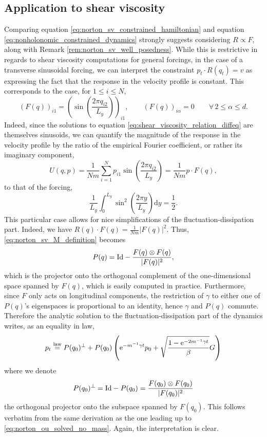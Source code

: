 \subsection{Application to shear viscosity}
Comparing equation \eqref{eq:norton_sv_constrained_hamiltonian} and equation \eqref{eq:nonholonomic_constrained_dynamics} strongly suggests considering $R\propto F$, along with Remark \ref{rem:norton_sv_well_posedness}.
While this is restrictive in regards to shear viscosity computations for general forcings, in the case of a transverse sinusoidal forcing, we can interpret the constraint $p_t\cdot R(q_t)=v$ as expressing the fact that the response in the velocity profile is constant.
This corresponds to the case, for $1\leq i\leq N$,
\[ \left(F(q)\right)_{i1}=\left(\sin\left(\frac{2\pi q_{i2}}{L_y}\right)\right)_{i1},\qquad \left(F(q)\right)_{i\alpha}=0\qquad\forall\,2\leq\alpha\leq d.\]
Indeed, since the solutions to equation \eqref{eq:shear_viscosity_relation_diffeq} are themselves sinusoids, we can quantify the magnitude of the response in the velocity profile by the ratio of the empirical Fourier coefficient, or rather its imaginary component,
\begin{equation}
    \label{eq:norton_sv_fourier_coeff}
    U(q,p)=\frac{1}{Nm}\sum_{i=1}^Np_{i1}\sin\left(\frac{2\pi q_{i2}}{L_y}\right)=\frac1{Nm}p\cdot F(q),
\end{equation}
to that of the forcing,
\[\frac1{L_y}\int_0^{L_y}\sin^2\left(\frac{2\pi y}{L_y}\right)\mathrm dy=\frac12.\]
This particular case allows for nice simplifications of the fluctuation-dissipation part. Indeed, we have $R(q)\cdot F(q)=\frac{1}{Nm}|F(q)|^2$.
Thus, \eqref{eq:norton_sv_M_definition} becomes
\[P(q)=\mathrm{Id}-\frac{F(q)\otimes F(q)}{|F(q)|^2},\]
which is the projector onto the orthogonal complement of the one-dimensional space spanned by $F(q)$, which is easily computed in practice. Furthermore, since $F$ only acts on longitudinal components, the restriction of $\gamma$ to either one of $P(q)$'s eigenspaces is proportional to an identity, hence $\gamma$ and $P(q)$ commute.
Therefore the analytic solution to the fluctuation-dissipation part of the dynamics writes, as an equality in law,
\begin{equation}
    \label{eq:norton_sv_fd_part_solved_ii}
            p_t\overset{\mathrm{law}}{=}P(q_0)^\perp +P(q_0)\left(\mathrm{e}^{-m^{-1}\gamma t}p_0+\sqrt{\frac{1-\mathrm{e}^{-2m^{-1}\gamma t}}{\beta}}G\right)
\end{equation}
where we denote
\[P(q_0)^\perp=\mathrm{Id}-P(q_0)=\frac{F(q_0)\otimes F(q_0)}{|F(q_0)|^2}\]
the orthogonal projector onto the subspace spanned by $F(q_0)$. This follows verbatim from the same derivation as the one leading up to \eqref{eq:norton_ou_solved_no_mass}. Again, the interpretation is clear.

